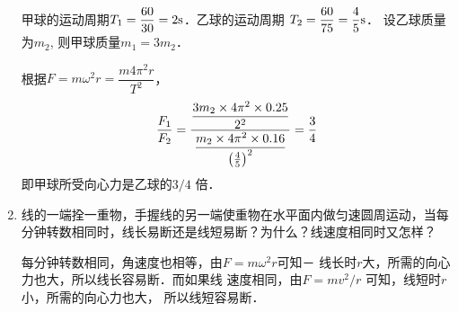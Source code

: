 \begin{enumerate}
\begin{solution}
    甲球的运动周期$T_1=\dfrac{60}{30}=2{\rm s}$．乙球的运动周期
    $T_2=\dfrac{60}{75}=\dfrac{4}{5}{\rm s}$．
设乙球质量为$m_2$, 则甲球质量$m_1=3m_2$．

    根据$F=m\omega^2 r=\dfrac{m4\pi^2 r}{T^2}$，
\[\frac{F_1}{F_2}=\frac{\dfrac{3m_2\times 4\pi^2\times 0.25}{2^2}}{\dfrac{m_2\times 4\pi^2\times 0.16}{\left(\frac{4}{5}\right)^2}}=\frac{3}{4}\]
    即甲球所受向心力是乙球的$3/4$
    倍．
\end{solution}
\item 线的一端拴一重物，手握线的另一端使重物在水平面内做匀速圆周运动，当每分钟转数相同时，线长易断还是线短易断？为什么？线速度相同时又怎样？

\begin{solution}
    每分钟转数相同，角速度也相等，由$F=m\omega^2r$可知－
    线长时$r$大，所需的向心力也大，所以线长容易断．而如果线
    速度相同，由$F=mv^2/r$
    可知，线短时$r$小，所需的向心力也大，
    所以线短容易断．
\end{solution}
\end{enumerate}




